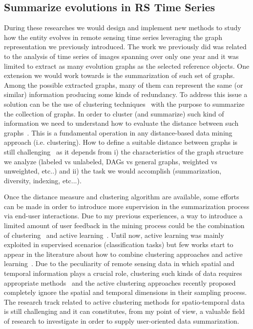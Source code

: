 \subsection{Summarize evolutions in RS Time Series}
During these researches we would design and implement new methods to study how the entity evolves in remote sensing time series leveraging the graph representation we previously introduced.
The work we previously did was related to the analysis of time series of images spanning over only one year and it was limited to extract as many evolution graphs as the selected reference objects. 
One extension we would work towards is the summarization of such set of graphs. Among the possible extracted graphs, many of them can represent the same (or similar) information producing some kinds of redundancy. To address this issue a solution can be the use of clustering techniques~\cite{IencoPM12} with the purpose to summarize the collection of graphs.
In order to cluster (and summarize) such kind of information we need to understand how to evaluate the distance between such graphs~\cite{SeelandKK12}.
This is a fundamental operation in any distance-based data mining approach (i.e. clustering). How to define a suitable distance between graphs is still challenging~\cite{SeelandKK12} as it depends from i) the characteristics of the graph structure we analyze (labeled vs unlabeled, DAGs vs general graphs, weighted vs unweighted, etc..) and ii) the task we would accomplish (summarization, diversity, indexing, etc...). 

Once the distance measure and clustering algorithm are available, some efforts can be made in order to introduce more supervision in the summarization process via end-user interactions. 
Due to my previous experiences, a way to introduce a limited amount of user feedback in the mining process could be the combination of clustering~\cite{IencoPM12,PensaIM14,RomeoTI14} and active learning~\cite{FuZL13}. 
Until now, active learning was mainly exploited in supervised scenarios (classification tasks) but few works start to appear in the literature about how to combine clustering approaches and active learning~\cite{FuZL13}. 
Due to the peculiarity of remote sensing data in which spatial and temporal information plays a crucial role, clustering such kinds of data requires appropriate  methods~\cite{BordognaI14} and the active clustering approaches recently proposed~\cite{PeiLF15,AbinB14,XiongAF14} completely ignore the spatial and temporal dimensions in their sampling process. The research track related to active clustering methods for spatio-temporal data is still challenging and it can constitutes, from my point of view, a valuable field of research to investigate in order to supply user-oriented data summarization.

